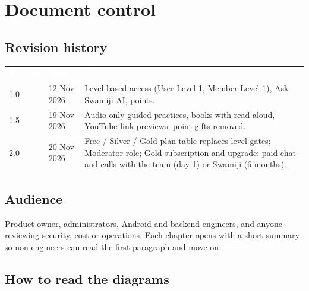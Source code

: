 \documentclass[11pt,a4paper,oneside]{report}
\newcommand{\thead}[1]{\textcolor{white}{\bfseries #1}}
\newcommand{\headrow}{\rowcolor{ojDeep}}
\begin{document}
\chapter*{Document control}

\section*{Revision history}
\begin{tabularx}{\textwidth}{@{}p{1.6cm}p{2.6cm}L@{}}
\headrow \thead{Version} & \thead{Date} & \thead{Change} \\
1.0 & 12 Nov 2026 & Level-based access (User Level 1, Member Level 1), Ask Swamiji AI, points. \\
1.5 & 19 Nov 2026 & Audio-only guided practices, books with read aloud, YouTube link previews; point gifts removed. \\
 2.0 & 20 Nov 2026 & Free / Silver / Gold plan table replaces level gates; Moderator role; Gold subscription and upgrade; paid chat and calls with the team (day 1) or Swamiji (6 months). \\
\bottomrule
\end{tabularx}

\section*{Audience}
Product owner, administrators, Android and backend engineers, and anyone reviewing security, cost or operations. Each chapter opens with a short summary so non-engineers can read the first paragraph and move on.

\section*{How to read the diagrams}
\begin{center}
\end{center}
\end{document}
